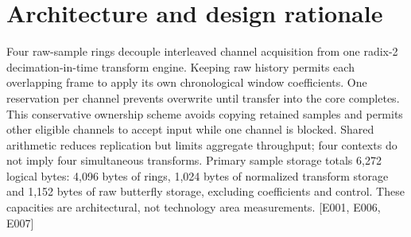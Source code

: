 \documentclass[11pt,a4paper]{article}
\begin{document}
\section{Architecture and design rationale}

Four raw-sample rings decouple interleaved channel acquisition from one radix-2 decimation-in-time transform engine. Keeping raw history permits each overlapping frame to apply its own chronological window coefficients. One reservation per channel prevents overwrite until transfer into the core completes. This conservative ownership scheme avoids copying retained samples and permits other eligible channels to accept input while one channel is blocked. Shared arithmetic reduces replication but limits aggregate throughput; four contexts do not imply four simultaneous transforms. Primary sample storage totals 6,\allowbreak{}272 logical bytes: 4,\allowbreak{}096 bytes of rings,\allowbreak{} 1,\allowbreak{}024 bytes of normalized transform storage and 1,\allowbreak{}152 bytes of raw butterfly storage,\allowbreak{} excluding coefficients and control. These capacities are architectural,\allowbreak{} not technology area measurements. [\allowbreak{}E001,\allowbreak{} E006,\allowbreak{} E007]\allowbreak{}
\end{document}
